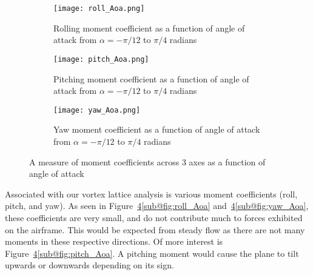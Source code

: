 \documentclass{article}
\begin{document}
\begin{figure}[H]
    \begin{adjustbox}{width=1.25\textwidth, center}
        \begin{minipage}{\textwidth}
            \begin{center}
                \begin{subfigure}[b]{.47\linewidth}
                    \centering
                    \texttt{[image: roll\_Aoa.png]}
                    \caption{Rolling moment coefficient as a function of angle of attack from $\alpha = -\pi/12$ to $\pi/4$ radians}\label{fig:roll_Aoa}
                \end{subfigure}
                \hfill
                \begin{subfigure}[b]{.47\linewidth}
                    \centering
                    \texttt{[image: pitch\_Aoa.png]}
                    \caption{Pitching moment coefficient as a function of angle of attack from $\alpha = -\pi/12$ to $\pi/4$ radians}\label{fig:pitch_Aoa}
                \end{subfigure}

                \vspace{0.5em}

                \begin{subfigure}[b]{.48\linewidth}
                    \centering
                    \texttt{[image: yaw\_Aoa.png]}
                    \caption{Yaw moment coefficient as a function of angle of attack from $\alpha = -\pi/12$ to $\pi/4$ radians}\label{fig:yaw_Aoa}
                \end{subfigure}
            \end{center}
        \end{minipage}
    \end{adjustbox}
    \centering
    \caption{A measure of moment coefficients across 3 axes as a function of angle of attack}\label{fig:moments}

\end{figure}
Associated with our vortex lattice analysis is various moment coefficients (roll, pitch, and yaw). As seen in Figure~\ref{fig:moments}\ref{sub@fig:roll_Aoa} and~\ref{fig:moments}\ref{sub@fig:yaw_Aoa}, these coefficients are very small, and do not contribute much to forces exhibited on the airframe. This would be expected from steady flow as there are not many moments in these respective directions.
Of more interest is Figure~\ref{fig:moments}\ref{sub@fig:pitch_Aoa}. A pitching moment would cause the plane to tilt upwards or downwards depending on its sign.
\end{document}
